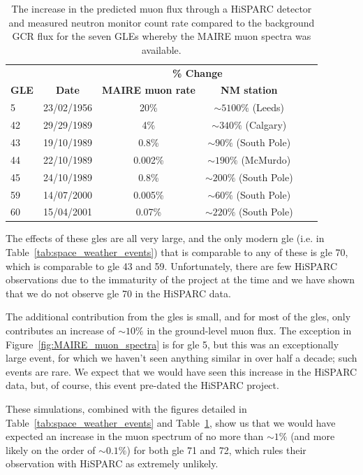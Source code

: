 \begin{table}
	\begin{center}
		\caption{The increase in the predicted muon flux through a HiSPARC detector and measured neutron monitor count rate compared to the background GCR flux for the seven GLEs whereby the MAIRE muon spectra was available.}
		\label{tab:MAIRE_GLEs}
		\begin{tabular}{l c c c c c}
			\hline
			 &  & \multicolumn{2}{c}{\bf \% Change} \\
			{\bf GLE} & {\bf Date} & {\bf MAIRE muon rate} & {\bf NM station} \\
			\hline
			5 & 23/02/1956 & 20\% & $\sim 5100\%$ (Leeds) \\
			42 & 29/29/1989 & 4\% & $\sim 340\%$ (Calgary) \\
			43 & 19/10/1989 & 0.8\% & $\sim 90\%$ (South Pole) \\
			44  & 22/10/1989 & 0.002\% & $\sim 190\%$ (McMurdo) \\
			45  & 24/10/1989 & 0.8\% & $\sim 200\%$ (South Pole) \\
			59 & 14/07/2000 & 0.005\% & $\sim 60\%$ (South Pole) \\
			60 & 15/04/2001 & 0.07\% & $\sim 220\%$ (South Pole) \\
			\hline
		\end{tabular}
	\end{center}
\end{table}


The effects of these \glspl{gle} are all very large, and the only modern \gls{gle} (i.e. in Table~\ref{tab:space_weather_events}) that is comparable to any of these is \gls{gle} 70, which is comparable to \gls{gle} 43 and 59. Unfortunately, there are few HiSPARC observations due to the immaturity of the project at the time and we have shown that we do not observe \gls{gle} 70 in the HiSPARC data.

The additional contribution from the \glspl{gle} is small, and for most of the \glspl{gle}, only contributes an increase of $\sim 10 \%$ in the ground-level muon flux. The exception in Figure~\ref{fig:MAIRE_muon_spectra} is for \gls{gle} 5, but this was an exceptionally large event, for which we haven't seen anything similar in over half a decade; such events are rare. We expect that we would have seen this increase in the HiSPARC data, but, of course, this event pre-dated the HiSPARC project.

These simulations, combined with the figures detailed in Table~\ref{tab:space_weather_events} and Table~\ref{tab:MAIRE_GLEs}, show us that we would have expected an increase in the muon spectrum of no more than $\sim 1\%$ (and more likely on the order of $\sim 0.1\%$) for both \gls{gle} 71 and 72, which rules their observation with HiSPARC as extremely unlikely.




